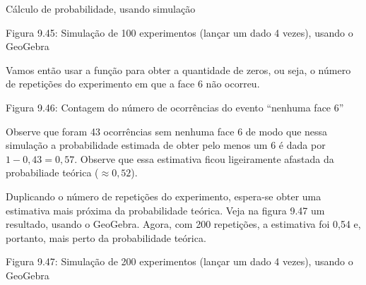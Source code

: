 \begin{example}{Cálculo de probabilidade, usando simulação}
\begin{figure}[H]
\noindent{}
\label{\detokenize{PE511-A:id9}}\end{figure}

Figura 9.45: Simulação de 100 experimentos (lançar um dado 4 vezes), usando o GeoGebra

Vamos então usar a função  para obter a quantidade de zeros, ou seja, o número de repetições do experimento em que a face 6 não ocorreu.
\label{\detokenize{PE511-A:id10}}
\begin{figure}[H]
\centering

\noindent{}
\label{\detokenize{PE511-A:id10}}\end{figure}

Figura 9.46: Contagem do número de ocorrências do evento “nenhuma face 6”

Observe que foram 43 ocorrências sem nenhuma face 6 de modo que nessa simulação a probabilidade estimada de obter pelo menos um 6 é dada por \(1-0,43=0,57\). Observe que essa estimativa ficou ligeiramente afastada da probabiliade teórica (\(\approx 0,52\)).

Duplicando o número de repetições do experimento, espera-se obter uma estimativa mais próxima da probabilidade teórica. Veja na figura 9.47 um resultado, usando o GeoGebra. Agora, com 200 repetições, a estimativa  foi 0,54 e, portanto, mais perto da probabilidade teórica.
\label{\detokenize{PE511-A:id11}}
\begin{figure}[H]
\centering

\noindent{}
\label{\detokenize{PE511-A:id11}}\end{figure}

Figura 9.47: Simulação de 200 experimentos (lançar um dado 4 vezes), usando o GeoGebra
\end{example}


